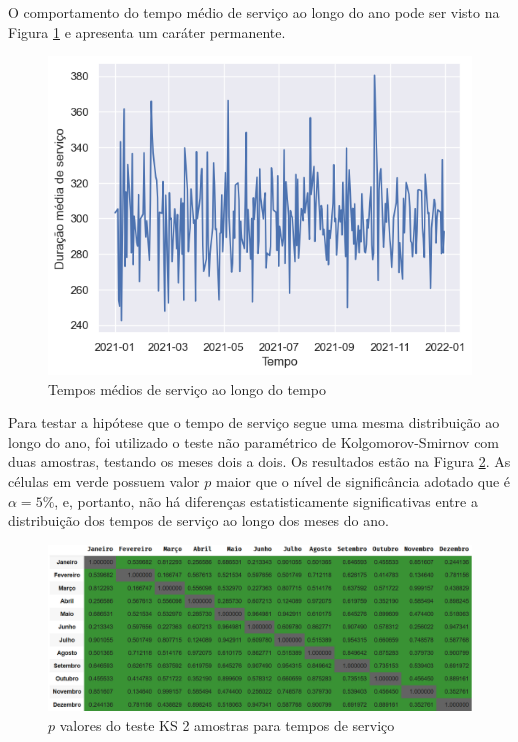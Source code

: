 O comportamento do tempo médio de serviço ao longo do ano pode ser visto na Figura \ref*{fig: t_servico-tempo} e apresenta um caráter permanente.

\begin{figure}[H]
    \includegraphics{analise-de-dados/anual/service_len.png}
    \caption{Tempos médios de serviço ao longo do tempo}
    \label{fig: t_servico-tempo}
\end{figure}

Para testar a hipótese que o tempo de serviço segue uma mesma distribuição ao longo do ano, foi utilizado o teste não paramétrico de Kolgomorov-Smirnov com duas amostras, testando os meses dois a dois. Os resultados estão na Figura \ref*{fig: KS_servico}. As células em verde possuem valor $p$ maior que o nível de significância adotado que é $\alpha = 5\%$, e, portanto, não há diferenças estatisticamente significativas entre a distribuição dos tempos de serviço ao longo dos meses do ano.

\begin{figure}[H]
    \includegraphics[scale=0.6]{analise-de-dados/anual/ks-service.png}
    \caption{$p$ valores do teste KS 2 amostras para tempos de serviço}
    \label{fig: KS_servico}
\end{figure}

